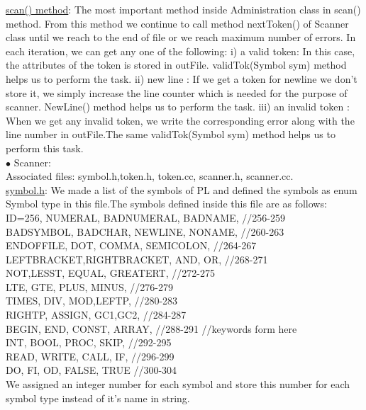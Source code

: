\documentclass[paper=letter, fontsize=12pt]{scrartcl} %
\begin{document}
\underline {scan() method}:  The most important method inside Administration class in scan() method. From this method we continue to call method nextToken() of Scanner class until we reach to the end of file or we reach maximum number of errors. In each iteration, we can get any one of the following:
i)   a valid token: In this case, the attributes of the token is stored in outFile. validTok(Symbol sym) method helps us to perform the task.
ii)  new line : If we get a token for newline we don't store it, we simply increase the line counter which is needed for the purpose of scanner. NewLine() method helps us to perform the task.
iii) an invalid token : When we get any invalid token, we write the corresponding error along with the line number in outFile.The same validTok(Symbol sym) method helps us to perform this task.\\


$\bullet$ Scanner:\\

Associated files: symbol.h,token.h, token.cc, scanner.h, scanner.cc.\\

\underline {symbol.h}: We made a list of the symbols of PL and defined the symbols as enum Symbol type in this file.The symbols defined inside this file are as follows:\\

ID=256, NUMERAL, BADNUMERAL, BADNAME, //256-259\\ 
BADSYMBOL, BADCHAR, NEWLINE, NONAME, //260-263\\
ENDOFFILE, DOT, COMMA, SEMICOLON, //264-267\\
LEFTBRACKET,RIGHTBRACKET, AND, OR, //268-271\\
NOT,LESST, EQUAL, GREATERT, //272-275\\
LTE, GTE, PLUS, MINUS, //276-279\\
TIMES, DIV, MOD,LEFTP, //280-283\\
RIGHTP, ASSIGN,	GC1,GC2, //284-287 \\
BEGIN, END, CONST, ARRAY, //288-291  //keywords form here\\
INT, BOOL, PROC, SKIP, //292-295\\
READ, WRITE, CALL, IF, //296-299\\
DO, FI, OD, FALSE, TRUE //300-304\\
We assigned an integer number for each symbol and store this number for each symbol type instead of it's name in string.\\
\end{document}
